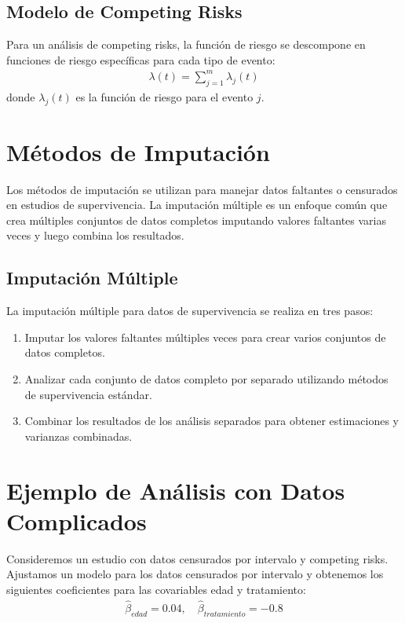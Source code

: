 \documentclass[a4paper]{report} %
\begin{document}
\subsection*{Modelo de Competing Risks}
Para un an\'alisis de competing risks, la funci\'on de riesgo se descompone en funciones de riesgo espec\'ificas para cada tipo de evento:
\begin{eqnarray*}
\lambda(t) = \sum_{j=1}^m \lambda_j(t)
\end{eqnarray*}
donde $\lambda_j(t)$ es la funci\'on de riesgo para el evento $j$.

\section{M\'etodos de Imputaci\'on}
Los m\'etodos de imputaci\'on se utilizan para manejar datos faltantes o censurados en estudios de supervivencia. La imputaci\'on m\'ultiple es un enfoque com\'un que crea m\'ultiples conjuntos de datos completos imputando valores faltantes varias veces y luego combina los resultados.

\subsection*{Imputaci\'on M\'ultiple}
La imputaci\'on m\'ultiple para datos de supervivencia se realiza en tres pasos:
\begin{enumerate}
    \item Imputar los valores faltantes m\'ultiples veces para crear varios conjuntos de datos completos.
    \item Analizar cada conjunto de datos completo por separado utilizando m\'etodos de supervivencia est\'andar.
    \item Combinar los resultados de los an\'alisis separados para obtener estimaciones y varianzas combinadas.
\end{enumerate}

\section*{Ejemplo de An\'alisis con Datos Complicados}
Consideremos un estudio con datos censurados por intervalo y competing risks. Ajustamos un modelo para los datos censurados por intervalo y obtenemos los siguientes coeficientes para las covariables edad y tratamiento:
\begin{eqnarray*}
\hat{\beta}_{edad} = 0.04, \quad \hat{\beta}_{tratamiento} = -0.8
\end{eqnarray*}
\end{document}
